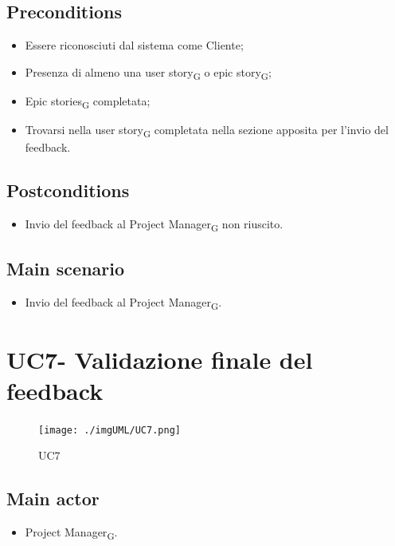 \documentclass{article}
\begin{document}
     \subsection*{Preconditions} 
 \begin{itemize}
        \item Essere riconosciuti dal sistema come Cliente;
        \item Presenza di almeno una user story\textsubscript{G}  o epic story\textsubscript{G};
        \item Epic stories\textsubscript{G}  completata;
        \item Trovarsi nella user story\textsubscript{G}  completata nella sezione apposita per l'invio del feedback.
    \end{itemize}
     \subsection*{Postconditions} 
        \begin{itemize}
            \item Invio del feedback al Project Manager\textsubscript{G}  non riuscito.
        \end{itemize} 
        \subsection*{Main scenario}
        \begin{itemize}
            \item Invio del feedback al Project Manager\textsubscript{G}.
        \end{itemize}

        
\section{UC7- Validazione finale del feedback}

\begin{figure}[h]
      \centering
      \texttt{[image: ./imgUML/UC7.png]}
        \caption{UC7}
      \label{fig:UC7}
    \end{figure}
    
    \subsection*{Main actor}
    \begin{itemize}
        \item Project Manager\textsubscript{G}.
    \end{itemize}
    
\end{document}
